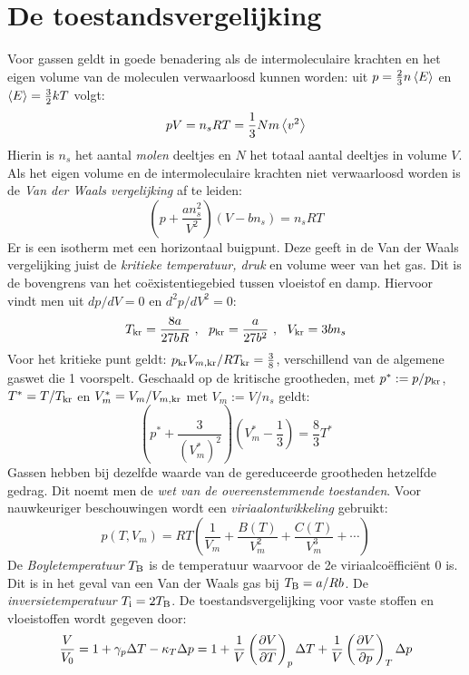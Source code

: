 \documentclass[twoside]{report}
\begin{document}
\section{De toestandsvergelijking}
Voor gassen geldt in goede benadering als de intermoleculaire krachten en het
eigen volume van de moleculen verwaarloosd kunnen worden: uit
$p=\frac{2}{3}n\left\langle E \right\rangle$ en $\left\langle E \right\rangle=\frac{3}{2}kT$ volgt:
\[
pV=n_sRT=\frac{1}{3}Nm\left\langle v^2 \right\rangle
\]
Hierin is $n_s$ het aantal {\it molen} deeltjes en $N$ het totaal aantal
deeltjes in volume $V$. Als het eigen volume en de intermoleculaire
krachten niet verwaarloosd worden is de {\it Van der Waals vergelijking} af
te leiden:
\[
\left(p+\frac{an_s^2}{V^2}\right)(V-bn_s)=n_sRT
\]
Er is een isotherm met een horizontaal buigpunt. Deze geeft in de Van der
Waals vergelijking juist de {\it kritieke temperatuur, druk} en {volume} weer
van het gas. Dit is de bovengrens van het co\"existentiegebied tussen
vloeistof en damp. Hiervoor vindt men uit $dp/dV=0$ en $d^2p/dV^2=0$:
\[
T_{\rm kr}=\frac{8a}{27bR}~,~~p_{\rm kr}=\frac{a}{27b^2}~,~~V_{\rm kr}=3bn_s
\]
Voor het kritieke punt geldt: $p_{\rm kr}V_{m,\rm kr}/RT_{\rm kr}=\frac{3}{8}$,
verschillend van de algemene gaswet die 1 voorspelt.
\npar
Geschaald op de kritische grootheden, met $p^*:=p/p_{\rm kr}$,
$T^*=T/T_{\rm kr}$ en $V_m^*=V_m/V_{m,\rm kr}$ met $V_m:=V/n_s$ geldt:
\[
\left(p^*+\frac{3}{(V_m^*)^2}\right)\left(V_m^*-\mbox{$\frac{1}{3}$}\right)=
\mbox{$\frac{8}{3}$}T^*
\]
Gassen hebben bij dezelfde waarde van de gereduceerde grootheden hetzelfde
gedrag. Dit noemt men de {\it wet van de overeenstemmende toestanden}. Voor
nauwkeuriger beschouwingen wordt een {\it viriaalontwikkeling} gebruikt:
\[
p(T,V_m)=RT\left(\frac{1}{V_m}+\frac{B(T)}{V_m^2}+\frac{C(T)}{V_m^3}+\cdots\right)
\]
De {\it Boyletemperatuur} $T_{\rm B}$ is de temperatuur waarvoor de 2e
viriaalco\"effici\"ent 0 is. Dit is in het geval van een Van der Waals gas
bij $T_{\rm B}=a/Rb$. De {\it inversietemperatuur} $T_{\rm i}=2T_{\rm B}$.
\npar
De toestandsvergelijking voor vaste stoffen en vloeistoffen wordt gegeven door:
\[
\frac{V}{V_0}=1+\gamma_p\Delta T-\kappa_T\Delta p=
1+\frac{1}{V}\left(\frac{\partial V}{\partial T}\right)_{p}\Delta T+\frac{1}{V}\left(\frac{\partial V}{\partial p}\right)_{T}\Delta p
\]
\end{document}
